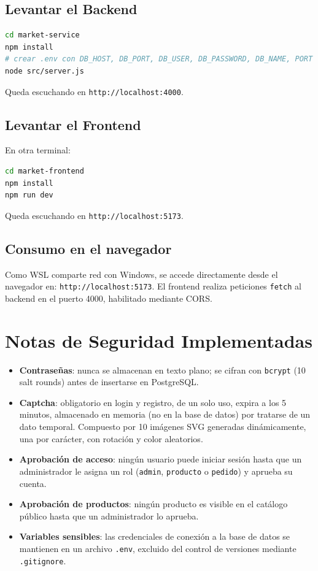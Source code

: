 \documentclass[11pt,a4paper]{article}
\begin{document}
\subsection{Levantar el Backend}
\begin{lstlisting}[language=bash]
cd market-service
npm install
# crear .env con DB_HOST, DB_PORT, DB_USER, DB_PASSWORD, DB_NAME, PORT
node src/server.js
\end{lstlisting}
Queda escuchando en \texttt{http://localhost:4000}.
 
\subsection{Levantar el Frontend}
En otra terminal:
\begin{lstlisting}[language=bash]
cd market-frontend
npm install
npm run dev
\end{lstlisting}
Queda escuchando en \texttt{http://localhost:5173}.
 
\subsection{Consumo en el navegador}
Como WSL comparte red con Windows, se accede directamente desde el navegador en:
\texttt{http://localhost:5173}. El frontend realiza peticiones \texttt{fetch} al backend en el puerto 4000, habilitado mediante CORS.
 
\section{Notas de Seguridad Implementadas}
 
\begin{itemize}
  \item \textbf{Contraseñas}: nunca se almacenan en texto plano; se cifran con \texttt{bcrypt} (10 salt rounds) antes de insertarse en PostgreSQL.
  \item \textbf{Captcha}: obligatorio en login y registro, de un solo uso, expira a los 5 minutos, almacenado en memoria (no en la base de datos) por tratarse de un dato temporal. Compuesto por 10 imágenes SVG generadas dinámicamente, una por carácter, con rotación y color aleatorios.
  \item \textbf{Aprobación de acceso}: ningún usuario puede iniciar sesión hasta que un administrador le asigna un rol (\texttt{admin}, \texttt{producto} o \texttt{pedido}) y aprueba su cuenta.
  \item \textbf{Aprobación de productos}: ningún producto es visible en el catálogo público hasta que un administrador lo aprueba.
  \item \textbf{Variables sensibles}: las credenciales de conexión a la base de datos se mantienen en un archivo \texttt{.env}, excluido del control de versiones mediante \texttt{.gitignore}.
\end{itemize}
 
\end{document}
